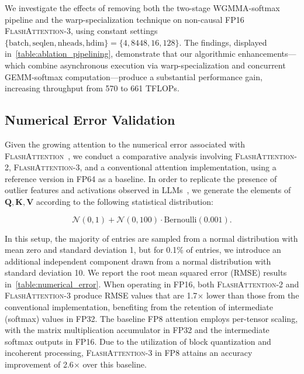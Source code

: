 \begin{algorithm}[H]
\begin{algorithmic}[1]
We investigate the effects of removing both the two-stage WGMMA-softmax pipeline and the warp-specialization technique on non-causal FP16 \textsc{FlashAttention-3}, using constant settings $\{\text{batch}, \text{seqlen}, \text{nheads}, \text{hdim}\} = \{ 4, 8448, 16, 128\}$. The findings, displayed in~\cref{table:ablation_pipelining}, demonstrate that our algorithmic enhancements—which combine asynchronous execution via warp-specialization and concurrent GEMM-softmax computation—produce a substantial performance gain, increasing throughput from 570 to 661 TFLOPs.

\subsection{Numerical Error Validation}
\label{sec:numerical_error}

Given the growing attention to the numerical error associated with \textsc{FlashAttention}~\citep{golden2024flash}, we conduct a comparative analysis involving \textsc{FlashAttention-2}, \textsc{FlashAttention-3}, and a conventional attention implementation, using a reference version in FP64 as a baseline. In order to replicate the presence of outlier features and activations observed in LLMs~\citep{dettmers2208llm, sun2024massive}, we generate the elements of $\mathbf{Q}, \mathbf{K}, \mathbf{V}$ according to the following statistical distribution:

\begin{equation*}
  \mathcal{N}(0, 1) + \mathcal{N}(0, 100) \cdot \mathrm{Bernoulli}(0.001).
\end{equation*}

In this setup, the majority of entries are sampled from a normal distribution with mean zero and standard deviation 1, but for 0.1\% of entries, we introduce an additional independent component drawn from a normal distribution with standard deviation 10. We report the root mean squared error (RMSE) results in~\cref{table:numerical_error}. When operating in FP16, both \textsc{FlashAttention-2} and \textsc{FlashAttention-3} produce RMSE values that are 1.7$\times$ lower than those from the conventional implementation, benefiting from the retention of intermediate (softmax) values in FP32. The baseline FP8 attention employs per-tensor scaling, with the matrix multiplication accumulator in FP32 and the intermediate softmax outputs in FP16. Due to the utilization of block quantization and incoherent processing, \textsc{FlashAttention-3} in FP8 attains an accuracy improvement of 2.6$\times$ over this baseline.


\end{algorithmic}
\end{algorithm}
